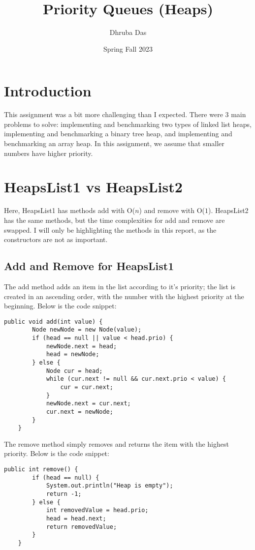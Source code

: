 \documentclass[a4paper,11pt]{article}
\begin{document}
\title{
    \textbf{Priority Queues (Heaps)}
}
\author{Dhruba Das}
\date{Spring Fall 2023}

\maketitle

\section*{Introduction}
This assignment was a bit more challenging than I expected. There were 3 main problems to solve: implementing and benchmarking two types of linked list heaps, implementing and benchmarking a binary tree heap, and implementing and benchmarking an array heap. In this assignment, we assume that smaller numbers have higher priority.


\section*{HeapsList1 vs HeapsList2}
Here, HeapsList1 has methods add with O($n$) and remove with O($1$). HeapsList2 has the same methods, but the time complexities for add and remove are swapped. I will only be highlighting the methods in this report, as the constructors are not as important.

\subsection*{Add and Remove for HeapsList1}
The add method adds an item in the list according to it's priority; the list is created in an ascending order, with the number with the highest priority at the beginning. Below is the code snippet:

\begin{verbatim}
public void add(int value) {
        Node newNode = new Node(value);
        if (head == null || value < head.prio) {
            newNode.next = head;
            head = newNode;
        } else {
            Node cur = head;
            while (cur.next != null && cur.next.prio < value) {
                cur = cur.next;
            }
            newNode.next = cur.next;
            cur.next = newNode;
        }
    }
\end{verbatim}


The remove method simply removes and returns the item with the highest priority. Below is the code snippet:

\begin{verbatim}
public int remove() {
        if (head == null) {
            System.out.println("Heap is empty");
            return -1;
        } else {
            int removedValue = head.prio;
            head = head.next;
            return removedValue;
        }
    }
\end{verbatim}
\end{document}
